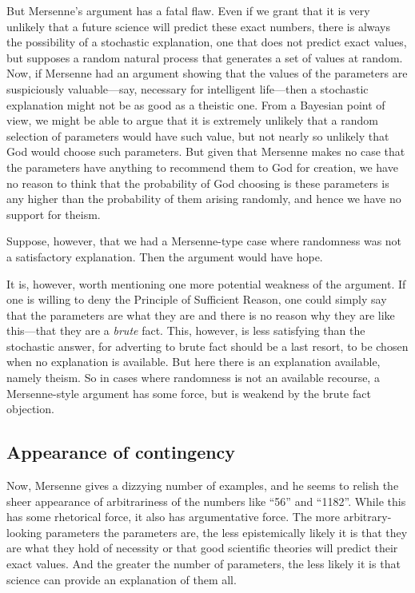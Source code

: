 But Mersenne's argument has a fatal flaw. Even if we grant that it is very unlikely that a future science will predict
these exact numbers, there is always the possibility of a stochastic explanation, one that does not predict exact values, 
but supposes a random natural process that generates a set of values at random. Now, if Mersenne had an argument showing
that the values of the parameters are suspiciously valuable---say, necessary for intelligent life---then a stochastic
explanation might not be as good as a theistic one. From a Bayesian point of view, we might be able to argue that it is
extremely unlikely that a random selection of parameters would have such value, but not nearly so unlikely that God would
choose such parameters. But given that Mersenne makes no case that 
the parameters have anything to recommend them to God for creation, we have no reason to think that the probability of God 
choosing is these parameters is any higher than the probability of them arising randomly, and hence we have no support for
theism.

Suppose, however, that we had a Mersenne-type case where randomness was not a satisfactory explanation. Then the argument
would have hope. 

It is, however, worth mentioning one more potential weakness of the argument. If one is willing to deny the Principle of Sufficient Reason, one could simply
say that the parameters are what they are and there is no reason why they are like this---that they are a \textit{brute} fact.
This, however, is less satisfying than the stochastic answer, for adverting to brute fact should be a last resort, to be
chosen when no explanation is available. But here there is an explanation available, namely theism. So in cases where 
randomness is not an available recourse, a Mersenne-style argument has some force, but is weakend by the brute fact
objection. 

\subsection{Appearance of contingency}
Now, Mersenne gives a dizzying number of examples, and he seems to relish the sheer appearance of arbitrariness of the numbers like ``56''
and ``1182''. While this has some rhetorical force, it also has argumentative force. The more arbitrary-looking parameters
the parameters are, the less epistemically likely it is that they are what they hold of necessity or that good scientific theories
will predict their exact values. And the greater the number of parameters, the less likely it is that science can provide 
an explanation of them all.

